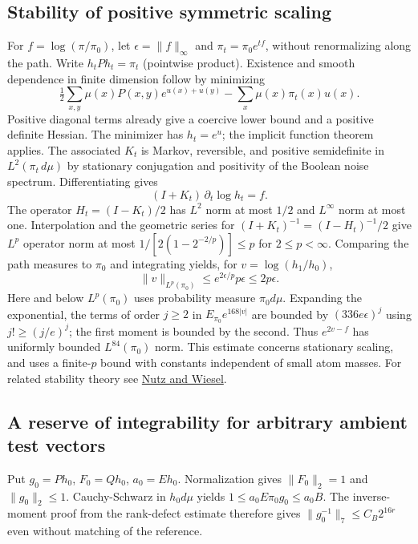 \documentclass[11pt]{article}
\begin{document}
\subsection{Stability of positive symmetric scaling}

For \(f=\log(\pi/\pi_0)\), let \(\epsilon=\|f\|_\infty\) and \(\pi_t=\pi_0 e^{tf}\), without renormalizing along the path. Write \(h_t P h_t=\pi_t\) (pointwise product). Existence and smooth dependence in finite dimension follow by minimizing
\[
 \tfrac12\sum_{x,y}\mu(x)P(x,y)e^{u(x)+u(y)}
 -\sum_x\mu(x)\pi_t(x)u(x).
\]
Positive diagonal terms already give a coercive lower bound and a positive definite Hessian. The minimizer has \(h_t=e^u\); the implicit function theorem applies. The associated \(K_t\) is Markov, reversible, and positive semidefinite in \(L^2(\pi_t\,d\mu)\) by stationary conjugation and positivity of the Boolean noise spectrum. Differentiating gives
\[
 (I+K_t)\,\partial_t\log h_t=f .
\]
The operator \(H_t=(I-K_t)/2\) has \(L^2\) norm at most \(1/2\) and \(L^\infty\) norm at most one. Interpolation and the geometric series for \((I+K_t)^{-1}=(I-H_t)^{-1}/2\) give \(L^p\) operator norm at most \(1/[2(1-2^{-2/p})]\le p\) for \(2\le p<\infty\). Comparing the path measures to \(\pi_0\) and integrating yields, for \(v=\log(h_1/h_0)\),
\[
 \|v\|_{L^p(\pi_0)}\le e^{2\epsilon/p}p\epsilon\le2p\epsilon .
\]
Here and below \(L^p(\pi_0)\) uses probability measure \(\pi_0d\mu\). Expanding the exponential, the terms of order \(j\ge2\) in \(E_{\pi_0}e^{168|v|}\) are bounded by \((336e\epsilon)^j\) using \(j!\ge(j/e)^j\); the first moment is bounded by the second. Thus \(e^{2v-f}\) has uniformly bounded \(L^{84}(\pi_0)\) norm. This estimate concerns stationary scaling, and uses a finite-\(p\) bound with constants independent of small atom masses. For related stability theory see \href{https://www.math.columbia.edu/~mnutz/docs/stabilityOfPotentials.pdf}{Nutz and Wiesel}.

\subsection{A reserve of integrability for arbitrary ambient test vectors}

Put \(g_0=Ph_0\), \(F_0=Qh_0\), \(a_0=Eh_0\). Normalization gives \(\|F_0\|_2=1\) and \(\|g_0\|_2\le1\). Cauchy-Schwarz in \(h_0d\mu\) yields \(1\le a_0 E\pi_0g_0\le a_0B\). The inverse-moment proof from the rank-defect estimate therefore gives
\(\|g_0^{-1}\|_7\le C_B2^{16r}\) even without matching of the reference.
\end{document}
